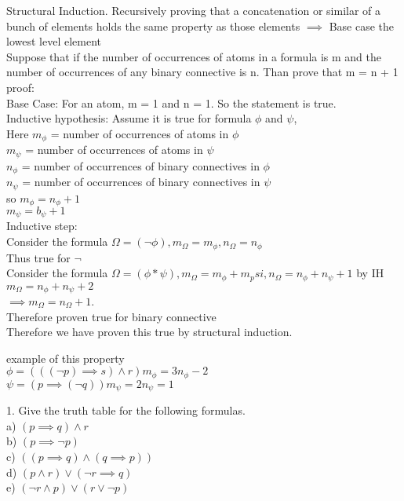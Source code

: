 \documentclass[12pt,oneside,notitlepage]{book}
\theoremstyle{definition}
\begin{document}
Structural Induction.
Recursively proving that a concatenation or similar of a bunch of elements holds the same property as those elements $\implies$ Base case the lowest level element \\
Suppose that if the number of occurrences of atoms in a formula is m and the number of occurrences of any binary connective is n. Than prove that m = n + 1
proof: \\
Base Case: For an atom, m = 1 and n = 1. So the statement is true. \\
Inductive hypothesis: Assume it is true for formula $\phi$ and $\psi$, \\
Here $m_\phi$ = number of occurrences of atoms in $\phi$ \\
$m_\psi$ = number of occurrences of atoms in $\psi$ \\
$n_\phi$ = number of occurrences of binary connectives in $\phi$ \\
$n_\psi$ = number of occurrences of binary connectives in $\psi$ \\
so $m_\phi = n_\phi + 1$ \\
$m_\psi = b_\psi + 1$ \\
Inductive step: \\
Consider the formula $\Omega = (\neg \phi), m_\Omega = m_\phi, n_\Omega = n_\phi$ \\
Thus true for $\neg$ \\
Consider the formula $\Omega = (\phi * \psi), m_\Omega = m_\phi + m_psi, n_\Omega = n_\phi + n_\psi + 1$ by IH \\
$m_\Omega = n_\phi + n_\psi + 2$ \\
$\implies m_\Omega = n_\Omega + 1$. \\
Therefore proven true for binary connective \\
Therefore we have proven this true by structural induction.

example of this property \\
$\phi = (((\neg p) \implies s) \land r) m_\phi = 3 n_\phi - 2$ \\
$\psi = (p \implies (\neg q)) m_\psi = 2 n_\psi = 1$

1. Give the truth table for the following formulas. \\
 a) $(p \implies q) \land r$ \\
b) $(p \implies \neg p)$ \\
c) $( (p \implies q) \land (q \implies p))$ \\
d) $(p \land r) \lor (\neg r \implies q)$ \\
e) $(\neg r \land p) \lor (r \lor \neg p)$ \\
\end{document}
